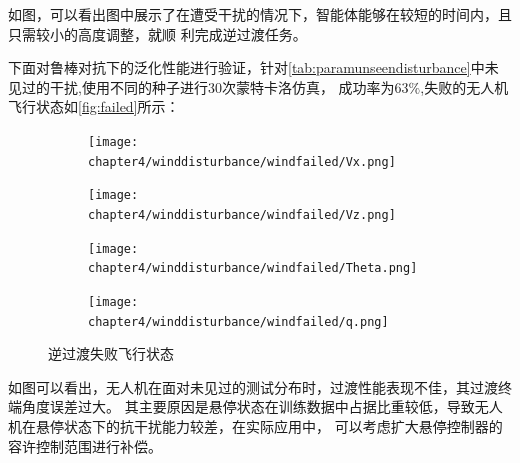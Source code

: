如图，可以看出图中展示了在遭受干扰的情况下，智能体能够在较短的时间内，且只需较小的高度调整，就顺
利完成逆过渡任务。

下面对鲁棒对抗下的泛化性能进行验证，针对\autoref{tab:paramunseendisturbance}中未见过的干扰,使用不同的种子进行30次蒙特卡洛仿真，
成功率为63$\%$,失败的无人机飞行状态如\autoref{fig:failed}所示：
\begin{figure}[H]
    \centering
    \begin{subfigure}{.55\textwidth}
        \centering
        \texttt{[image: chapter4/winddisturbance/windfailed/Vx.png]}
        \label{fig:sub1}
        \end{subfigure}%
        \begin{subfigure}{.55\textwidth}
        \centering
        \texttt{[image: chapter4/winddisturbance/windfailed/Vz.png]}
        \label{fig:sub2}
        \end{subfigure}
    \begin{subfigure}{.55\textwidth}
        \centering
        \texttt{[image: chapter4/winddisturbance/windfailed/Theta.png]}
        \label{fig:sub3}
    \end{subfigure}%
    \begin{subfigure}{.55\textwidth}
        \centering
        \texttt{[image: chapter4/winddisturbance/windfailed/q.png]}
        \label{fig:sub4}
    \end{subfigure}
\caption{逆过渡失败飞行状态}
\label{fig:failed}
\end{figure}
如图可以看出，无人机在面对未见过的测试分布时，过渡性能表现不佳，其过渡终端角度误差过大。
其主要原因是悬停状态在训练数据中占据比重较低，导致无人机在悬停状态下的抗干扰能力较差，在实际应用中，
可以考虑扩大悬停控制器的容许控制范围进行补偿。

